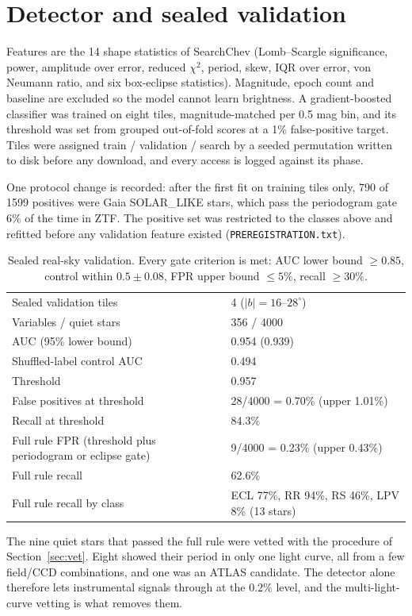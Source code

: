 \documentclass[11pt]{article}
\begin{document}
\section{Detector and sealed validation}
Features are the 14 shape statistics of SearchChev (Lomb--Scargle significance, power, amplitude over error, reduced $\chi^2$, period, skew, IQR over error, von Neumann ratio, and six box-eclipse statistics). Magnitude, epoch count and baseline are excluded so the model cannot learn brightness. A gradient-boosted classifier was trained on eight tiles, magnitude-matched per 0.5 mag bin, and its threshold was set from grouped out-of-fold scores at a 1\% false-positive target. Tiles were assigned train / validation / search by a seeded permutation written to disk before any download, and every access is logged against its phase.

One protocol change is recorded: after the first fit on training tiles only, 790 of 1599 positives were Gaia SOLAR\_LIKE stars, which pass the periodogram gate 6\% of the time in ZTF. The positive set was restricted to the classes above and refitted before any validation feature existed (\texttt{PREREGISTRATION.txt}).

\begin{table}[h]\centering
\begin{tabular}{p{8cm}p{6.5cm}}\toprule
Sealed validation tiles & 4 ($|b|=16$--$28^\circ$)\\
Variables / quiet stars & 356 / 4000\\
AUC (95\% lower bound) & 0.954 (0.939)\\
Shuffled-label control AUC & 0.494\\
Threshold & 0.957\\
False positives at threshold & 28/4000 = 0.70\% (upper 1.01\%)\\
Recall at threshold & 84.3\%\\
Full rule FPR (threshold plus periodogram or eclipse gate) & 9/4000 = 0.23\% (upper 0.43\%)\\
Full rule recall & 62.6\%\\
Full rule recall by class & ECL 77\%, RR 94\%, RS 46\%, LPV 8\% (13 stars)\\
\bottomrule\end{tabular}
\caption{Sealed real-sky validation. Every gate criterion is met: AUC lower bound $\ge0.85$, control within $0.5\pm0.08$, FPR upper bound $\le5\%$, recall $\ge30\%$.}
\end{table}

The nine quiet stars that passed the full rule were vetted with the procedure of Section~\ref{sec:vet}. Eight showed their period in only one light curve, all from a few field/CCD combinations, and one was an ATLAS candidate. The detector alone therefore lets instrumental signals through at the $0.2\%$ level, and the multi-light-curve vetting is what removes them.
\end{document}

